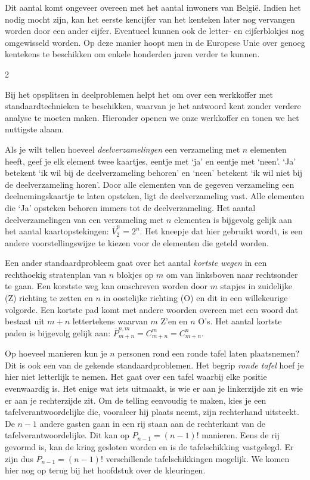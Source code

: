 Dit aantal komt ongeveer overeen met het aantal inwoners van België. Indien het nodig mocht zijn, kan het eerste kencijfer van het kenteken later nog vervangen worden door een ander cijfer. Eventueel kunnen ook de letter- en cijferblokjes nog omgewisseld worden. Op deze manier hoopt men in de Europese Unie over genoeg kentekens te beschikken om enkele honderden jaren verder te kunnen.


\eindewerktekst

\begin{multicols}{2} 

Bij het opsplitsen in deelproblemen helpt het om over een werkkoffer met standaardtechnieken te beschikken, waarvan je het antwoord kent zonder verdere analyse te moeten maken. Hieronder openen we onze werkkoffer en tonen we het nuttigste alaam.

Als je wilt tellen hoeveel \emph{deelverzamelingen} een verzameling met $n$ elementen heeft, geef je elk element twee kaartjes, eentje met ‘ja’ en eentje met ‘neen’. ‘Ja’ betekent ‘ik wil bij de deelverzameling behoren’ en ‘neen’ betekent ‘ik wil niet bij de deelverzameling horen’. Door alle elementen van de gegeven verzameling een deelnemingskaartje te laten opsteken, ligt de deelverzameling vast. Alle elementen die ‘Ja’ opsteken behoren immers tot de deelverzameling. Het aantal deelverzamelingen van een verzameling met $n$ elementen is bijgevolg gelijk aan het aantal kaartopstekingen: $\overline{V}_2^n=2^n$. Het kneepje dat hier gebruikt wordt, is een andere voorstellingswijze te kiezen voor de elementen die geteld worden.

Een ander standaardprobleem gaat over het aantal \emph{kortste wegen} in een rechthoekig stratenplan van $n$ blokjes op $m$ om van linksboven naar rechtsonder te gaan. Een korstste weg kan omschreven worden door $m$ stapjes in zuidelijke (Z) richting te zetten en $n$ in oostelijke richting (O) en dit in een willekeurige volgorde. Een kortste pad komt met andere woorden overeen met een woord dat bestaat uit $m+n$ lettertekens waarvan $m$ Z'en en $n$ O's. Het aantal kortste paden is bijgevolg gelijk aan: $\overline{P}_{m+n}^{n,m}=C_{m+n}^m=C_{m+n}^n$.

Op hoeveel manieren kun je $n$ personen rond een ronde tafel laten plaatsnemen? Dit is ook een van de gekende standaardproblemen. Het begrip \emph{ronde tafel} hoef je hier niet letterlijk te nemen. Het gaat over een tafel waarbij elke positie evenwaardig is. Het enige wat iets uitmaakt, is wie er aan je linkerzijde zit en wie er aan je rechterzijde zit. Om de telling eenvoudig te maken, kies je een tafelverantwoordelijke die, vooraleer hij plaats neemt, zijn rechterhand uitsteekt. De $n-1$ andere gasten gaan in een rij staan aan de rechterkant van de tafelverantwoordelijke. Dit kan op $P_{n-1}=(n-1)!$ manieren. Eens de rij gevormd is, kan de kring gesloten worden en is de tafelschikking vastgelegd. Er zijn dus $P_{n-1}=(n-1)!$ verschillende tafelschikkingen mogelijk. We komen hier nog op terug bij het hoofdstuk over de kleuringen.


\end{multicols}
